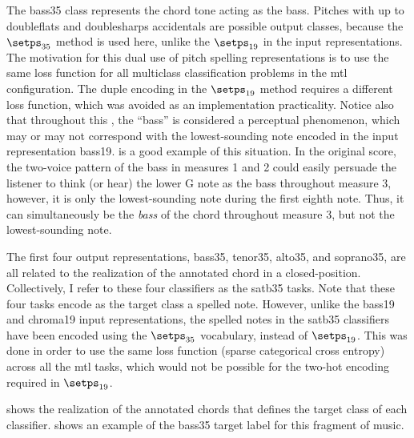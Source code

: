 
The \gls{bass35} class represents the chord tone acting as
the bass. Pitches with up to \glspl{doubleflat} and
\glspl{doublesharp} accidentals are possible output classes,
because the $\setps_{35}$ method is used here, unlike the
$\setps_{19}$ in the input representations. The motivation
for this dual use of pitch spelling representations is to
use the same loss function for all multiclass classification
problems in the \gls{mtl} configuration. The duple encoding
in the $\setps_{19}$ method requires a different loss
function, which was avoided as an implementation
practicality. Notice also that throughout this
\thesisdiss{}, the ``bass'' is considered a perceptual
phenomenon, which may or may not correspond with the
lowest-sounding note encoded in the input representation
\gls{bass19}.  is a good example of
this situation. In the original score, the two-voice pattern
of the bass in measures 1 and 2 could easily persuade the
listener to think (or hear) the lower G note as the bass
throughout measure 3, however, it is only the
lowest-sounding note during the first eighth note. Thus, it
can simultaneously be the \emph{bass} of the chord
throughout measure 3, but not the lowest-sounding note.

The first four output representations, \gls{bass35},
\gls{tenor35}, \gls{alto35}, and \gls{soprano35}, are all
related to the realization of the annotated chord in a
\gls{closed-position}. Collectively, I refer to these four
classifiers as the \gls{satb35} tasks. Note that these four
tasks encode as the target class a spelled note. However,
unlike the \gls{bass19} and \gls{chroma19} input
representations, the spelled notes in the \gls{satb35}
classifiers have been encoded using the $\setps_{35}$
vocabulary, instead of $\setps_{19}$. This was done in order
to use the same loss function (sparse categorical cross
entropy) across all the \gls{mtl} tasks, which would not be
possible for the two-hot encoding required in $\setps_{19}$.

 shows the realization of the annotated
chords that defines the target class of each classifier.
 shows an example of the \gls{bass35}
target label for this fragment of music.




